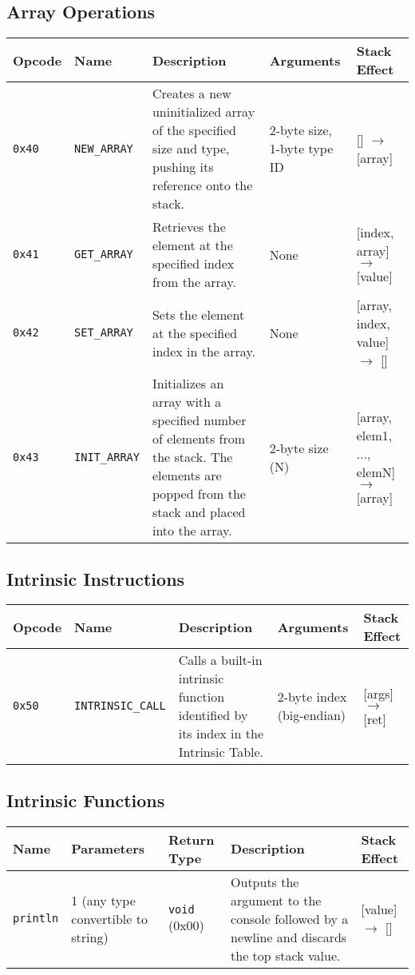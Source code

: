 \documentclass[a4paper,12pt]{article}
\begin{document}
    \subsection{Array Operations}
    \begin{tabular}{|l|l|p{4cm}|p{4cm}|p{4cm}|}
        \hline
        \textbf{Opcode} & \textbf{Name} & \textbf{Description} & \textbf{Arguments} & \textbf{Stack Effect} \\ \hline
        \texttt{0x40} & \texttt{NEW\_ARRAY} & Creates a new uninitialized array of the specified size and type, pushing its reference onto the stack. & 2-byte size, 1-byte type ID & [] $\rightarrow$ [array] \\ \hline
        \texttt{0x41} & \texttt{GET\_ARRAY} & Retrieves the element at the specified index from the array. & None & [index, array] $\rightarrow$ [value] \\ \hline
        \texttt{0x42} & \texttt{SET\_ARRAY} & Sets the element at the specified index in the array. & None & [array, index, value] $\rightarrow$ [] \\ \hline
        \texttt{0x43} & \texttt{INIT\_ARRAY} & Initializes an array with a specified number of elements from the stack. The elements are popped from the stack and placed into the array. & 2-byte size (N) & [array, elem1, ..., elemN] $\rightarrow$ [array] \\ \hline
    \end{tabular}
    \label{tab:array_operations}

    \subsection{Intrinsic Instructions}
    \begin{tabular}{|l|l|p{4cm}|l|l|}
        \hline
        \textbf{Opcode} & \textbf{Name} & \textbf{Description} & \textbf{Arguments} & \textbf{Stack Effect} \\ \hline
        \texttt{0x50} & \texttt{INTRINSIC\_CALL} & Calls a built-in intrinsic function identified by its index in the Intrinsic Table. & 2-byte index (big-endian) & [args] $\rightarrow$ [ret] \\ \hline
    \end{tabular}
    \label{tab:intrinsic_instructions}

    \subsection{Intrinsic Functions}
    \begin{tabular}{|l|l|l|p{4cm}|l|}
        \hline
        \textbf{Name} & \textbf{Parameters} & \textbf{Return Type} & \textbf{Description} & \textbf{Stack Effect} \\ \hline
        \texttt{println} & 1 (any type convertible to string) & \texttt{void} (0x00) & Outputs the argument to the console followed by a newline and discards the top stack value. & [value] $\rightarrow$ [] \\ \hline
    \end{tabular}
    \label{tab:intrinsic_functions}
\end{document}

